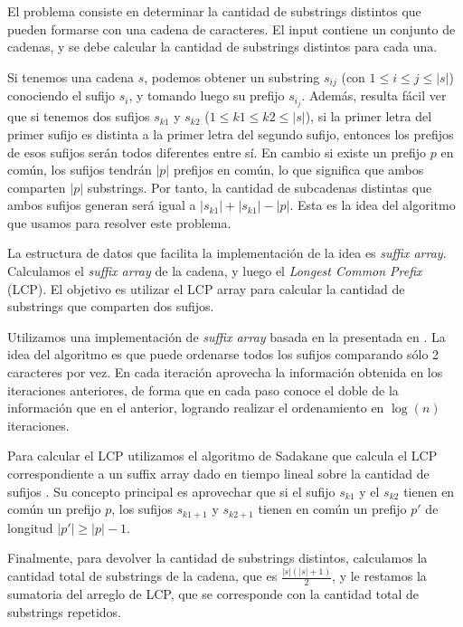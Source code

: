 El problema consiste en determinar la cantidad de substrings distintos que
pueden formarse con una cadena de caracteres. El input contiene un conjunto de
cadenas, y se debe calcular la cantidad de substrings distintos para cada una.

Si tenemos una cadena $s$, podemos obtener un substring $s_{ij}$ (con $1
\le i \le j \le |s|$) conociendo el sufijo $s_i$, y tomando luego su prefijo
$s_{i_j}$. Además, resulta fácil ver que si tenemos dos sufijos $s_{k1}$ y
$s_{k2}$ ($1 \le k1 \le k2 \le |s|$), si la primer letra del primer sufijo es
distinta a la primer letra del segundo sufijo, entonces los prefijos de esos
sufijos serán todos diferentes entre sí. En cambio si existe un prefijo $p$
en común, los sufijos tendrán $|p|$ prefijos en común, lo que significa
que ambos comparten $|p|$ substrings. Por tanto, la cantidad de subcadenas
distintas que ambos sufijos generan será igual a $|s_{k1}| + |s_{k1}| -
|p|$. Esta es la idea del algoritmo que usamos para resolver este problema.

La estructura de datos que facilita la implementación de la idea es {\sl suffix
array}. Calculamos el {\sl suffix array} de la cadena, y luego el {\sl Longest
Common Prefix} (LCP). El objetivo es utilizar el LCP array para calcular la
cantidad de substrings que comparten dos sufijos.

Utilizamos una implementación de {\sl suffix array} basada en la presentada
en \cite{kasai}. La idea del algoritmo es que puede ordenarse todos los
sufijos comparando sólo 2 caracteres por vez. En cada iteración aprovecha
la información obtenida en los iteraciones anteriores, de forma que en
cada paso conoce el doble de la información que en el anterior, logrando
realizar el ordenamiento en $\log(n)$ iteraciones.

Para calcular el LCP utilizamos el algoritmo de Sadakane que calcula el LCP
correspondiente a un suffix array dado en tiempo lineal sobre la cantidad de
sufijos \cite{sadakane}. Su concepto principal es aprovechar que si el sufijo
$s_{k1}$ y el $s_{k2}$ tienen en común un prefijo $p$, los sufijos $s_{k1+1}$ y
$s_{k2+1}$ tienen en común un prefijo $p'$ de longitud $|p'| \ge |p|-1$.

Finalmente, para devolver la cantidad de substrings distintos,
calculamos la cantidad total de substrings de la cadena, que es
$\displaystyle\frac{|s|(|s|+1)}{2}$, y le restamos la sumatoria del arreglo
de LCP, que se corresponde con la cantidad total de substrings repetidos.


